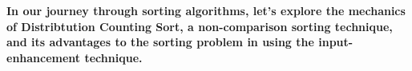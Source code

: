 \documentclass[preview]{standalone}
\begin{document}
\begin{center}
\textbf{In our journey through sorting algorithms, let's explore the mechanics of Distribtution Counting Sort, a non-comparison sorting technique, and its advantages to the sorting problem in using the input-enhancement technique.}
\end{center}
\end{document}
